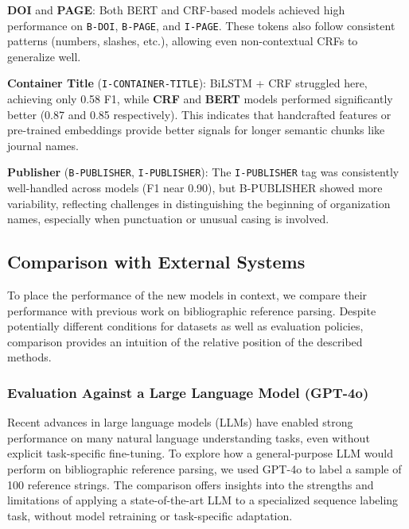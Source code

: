 \begin{itemize}
\begin{compactitem}
\item \textbf{DOI} and \textbf{PAGE}: Both BERT and CRF-based models achieved high performance on \texttt{B-DOI}, \texttt{B-PAGE}, and \texttt{I-PAGE}. These tokens also follow consistent patterns (numbers, slashes, etc.), allowing even non-contextual CRFs to generalize well.
\item \textbf{Container Title} (\texttt{I-CONTAINER-TITLE}): BiLSTM + CRF struggled here, achieving only 0.58 F1, while \textbf{CRF} and \textbf{BERT} models performed significantly better (0.87 and 0.85 respectively). This indicates that handcrafted features or pre-trained embeddings provide better signals for longer semantic chunks like journal names.
\item \textbf{Publisher} (\texttt{B-PUBLISHER}, \texttt{I-PUBLISHER}): The \texttt{I-PUBLISHER} tag was consistently well-handled across models (F1 near 0.90), but B-PUBLISHER showed more variability, reflecting challenges in distinguishing the beginning of organization names, especially when punctuation or unusual casing is involved.
\end{compactitem}
\end{itemize}

\subsection{Comparison with External Systems}
To place the performance of the new models in context, we compare their performance with previous work on bibliographic reference parsing. Despite potentially different conditions for datasets as well as evaluation policies, comparison provides an intuition of the relative position of the described methods.

\subsubsection{Evaluation Against a Large Language Model (GPT-4o)}
Recent advances in large language models (LLMs) have enabled strong performance on many natural language understanding tasks, even without explicit task-specific fine-tuning.
To explore how a general-purpose LLM would perform on bibliographic reference parsing, we used GPT-4o to label a sample of 100 reference strings.
The comparison offers insights into the strengths and limitations of applying a state-of-the-art LLM to a specialized sequence labeling task, without model retraining or task-specific adaptation.

